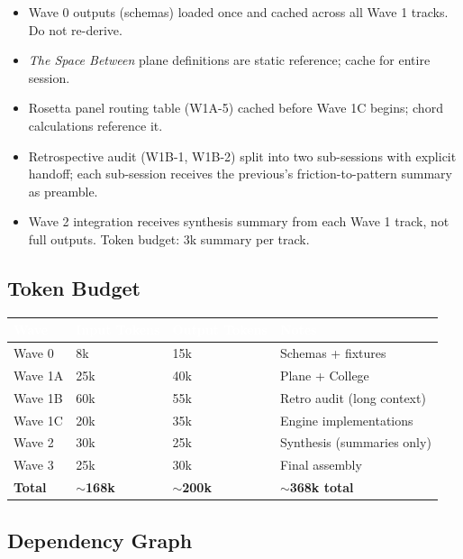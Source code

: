 \documentclass[11pt,letterpaper]{article}
\newcommand{\tableheader}[1]{\textbf{\sffamily\textcolor{white}{#1}}}
\begin{document}
\begin{itemize}[noitemsep]
  \item Wave 0 outputs (schemas) loaded once and cached across all Wave 1 tracks. Do not re-derive.
  \item \textit{The Space Between} plane definitions are static reference; cache for entire session.
  \item Rosetta panel routing table (W1A-5) cached before Wave 1C begins; chord calculations reference it.
  \item Retrospective audit (W1B-1, W1B-2) split into two sub-sessions with explicit handoff; each sub-session receives the previous's friction-to-pattern summary as preamble.
  \item Wave 2 integration receives synthesis summary from each Wave 1 track, not full outputs. Token budget: 3k summary per track.
\end{itemize}

\subsection{Token Budget}

\begin{center}
\begin{tabularx}{\textwidth}{L{3cm}C{2.5cm}C{2.5cm}X}
\toprule
{}
\tableheader{Wave} & \tableheader{Input Tokens} & \tableheader{Output Tokens} & \tableheader{Notes} \\
\midrule
Wave 0 & 8k & 15k & Schemas + fixtures \\
Wave 1A & 25k & 40k & Plane + College \\
Wave 1B & 60k & 55k & Retro audit (long context) \\
Wave 1C & 20k & 35k & Engine implementations \\
Wave 2 & 30k & 25k & Synthesis (summaries only) \\
Wave 3 & 25k & 30k & Final assembly \\
\midrule
\textbf{Total} & \textbf{$\sim$168k} & \textbf{$\sim$200k} & \textbf{$\sim$368k total} \\
\bottomrule
\end{tabularx}
\end{center}

\subsection{Dependency Graph}
\end{document}
